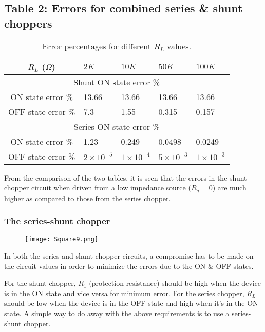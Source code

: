 \documentclass[a4paper,9pt,twoside,openany,twocolumn]{memoir}
\renewcommand{\arraystretch}{0.9}  %
\begin{document}
\subsection*{Table 2: Errors for combined series \& shunt choppers}

\begin{table}[h!]
\centering
\setlength{\tabcolsep}{2pt} %
\renewcommand{\arraystretch}{1.2} %
\begin{tabularx}{\columnwidth}{|c|X|X|X|X|}
\hline
$R_L$ (\(\Omega\)) & $2K$ & $10K$ & $50K$ & $100K$ \\
\hline
\multicolumn{5}{|c|}{Shunt ON state error \%} \\
\hline
ON state error \% & 13.66 & 13.66 & 13.66 & 13.66 \\
OFF state error \% & 7.3  & 1.55 & 0.315 & 0.157 \\
\hline
\multicolumn{5}{|c|}{Series ON state error \%} \\
\hline
ON state error \% & 1.23 & 0.249 & 0.0498 & 0.0249 \\
OFF state error \% & $2 \times 10^{-5}$ & $1 \times 10^{-4}$ & $5 \times 10^{-3}$ & $1 \times 10^{-3}$ \\
\hline
\end{tabularx}
\caption{Error percentages for different $R_L$ values.}
\label{tab:error_percentages}
\end{table}


From the comparison of the two tables, it is seen that the errors in the shunt chopper circuit when driven from a low impedance source ($R_g = 0$) are much higher as compared to those from the series chopper.

\subsubsection*{The series-shunt chopper}
\begin{figure}[h]
    \centering
    \texttt{[image: Square9.png]}
    \caption{}
\end{figure}

In both the series and shunt chopper circuits, a compromise has to be made on the circuit values in order to minimize the errors due to the ON \& OFF states.

For the shunt chopper, $R_1$ (protection resistance) should be high when the device is in the ON state and vice versa for minimum error. For the series chopper, $R_L$ should be low when the device is in the OFF state and high when it’s in the ON state. A simple way to do away with the above requirements is to use a series-shunt chopper.
\end{document}
